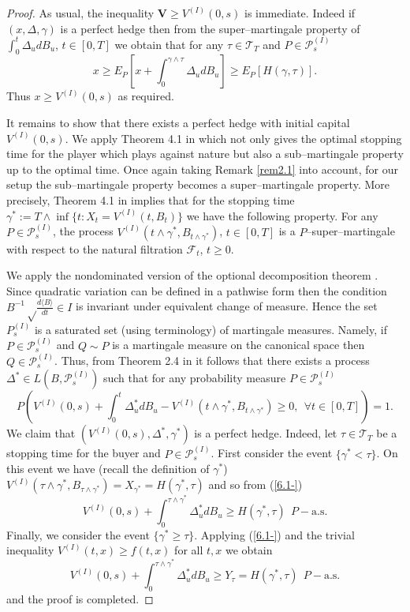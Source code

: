 \documentclass{amsart}
\numberwithin{equation}{section}
\begin{document}
\begin{proof}
As usual, the inequality $\mathbf V\geq V^{(I)}(0,s)$ is immediate. Indeed if
$(x,\Delta,\gamma)$ is a perfect hedge then from the super--martingale property of
$\int_{0}^t \Delta_u dB_u$, $t\in [0,T]$ we obtain that
for any $\tau\in \mathcal T_T$ and $P\in\mathcal P^{(I)}_s$
$$x\geq E_P\left[x+\int_{0}^{\gamma\wedge\tau} \Delta_u dB_u\right]\geq  E_P [H(\gamma,\tau)].$$
Thus $x\geq V^{(I)}(0,s)$
as required.

It remains to show that there exists a perfect hedge with initial capital
$V^{(I)}(0,s)$.
We apply Theorem 4.1 in \cite{BY} which not only gives the optimal stopping time for the
player which plays against nature but also
a sub--martingale property up to the optimal time. Once again taking Remark \ref{rem2.1} into account, for our setup
the sub--martingale property
becomes
a super--martingale property.
More precisely, Theorem 4.1 in \cite{BY} implies that for
the stopping time $\gamma^{*}:=T\wedge\inf\{t: X_t=V^{(I)}(t,B_t)\}$ we have the following property.
For any $P\in\mathcal P^{(I)}_s$,
the process
$V^{(I)}(t\wedge\gamma^{*},B_{t\wedge\gamma^{*}})$, $t\in [0,T]$ is a $P$--super--martingale
with respect to
the natural filtration $\mathcal F_t$, $t\geq 0$.

We apply the nondominated version of the optional decomposition theorem .
Since quadratic variation can be defined in a pathwise form then the condition
$B^{-1}\sqrt\frac{d\langle  B\rangle }{dt}\in I$ is invariant under equivalent change of measure. Hence the
set
$P^{(I)}_s$ is a saturated set (using \cite{Nu} terminology) of martingale measures. Namely, if
$P\in \mathcal P^{(I)}_s$ and $Q\sim P$ is a martingale measure on the canonical space then
$Q\in \mathcal P^{(I)}_s$. Thus, from Theorem 2.4 in \cite{Nu} it follows that there exists a process
$\Delta^{*}\in L(B,\mathcal P^{(I)}_s)$ such that for any probability measure $P\in\mathcal P^{(I)}_s$
\begin{equation}\label{6.1-}
P\left(V^{(I)}(0,s)+\int_{0}^{t}\Delta^{*}_u dB_u- V^{(I)}(t\wedge\gamma^{*},B_{t\wedge\gamma^{*}})\geq 0, \ \ \forall t\in [0,T]\right)=1.
\end{equation}
We claim that $(V^{(I)}(0,s),\Delta^{*},\gamma^{*})$ is a perfect hedge. Indeed,
let $\tau\in\mathcal T_T$ be a stopping time for the buyer and $P\in\mathcal P^{(I)}_s$.
First consider the event $\{\gamma^{*}<\tau\}$.
On this event we have (recall the definition of $\gamma^{*}$)
$V^{(I)}(\tau\wedge\gamma^{*},B_{\tau\wedge\gamma^{*}})=X_{\gamma^{*}}=H(\gamma^{*},\tau)$ and so from (\ref{6.1-})
\begin{equation*}
V^{(I)}(0,s)+\int_{0}^{\tau\wedge\gamma^{*}}\Delta^{*}_u dB_u\geq H(\gamma^{*},\tau) \ \ P-\mbox{a.s.}
\end{equation*}
Finally, we consider the event $\{\gamma^{*}\geq\tau\}$. Applying (\ref{6.1-}) and the trivial inequality
$V^{(I)}(t,x)\geq f(t,x)$ for all $t,x$
we obtain
\begin{equation*}
V^{(I)}(0,s)+\int_{0}^{\tau\wedge\gamma^{*}}\Delta^{*}_u dB_u\geq Y_{\tau}=H(\gamma^{*},\tau) \ \ P-\mbox{a.s.}
\end{equation*}
and the proof is completed.
\end{proof}
\end{document}
